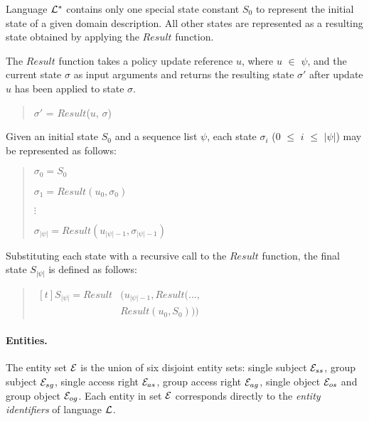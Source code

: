 \documentclass[10pt, twocolumn]{article}
\begin{document}
        Language ${\cal L}^{*}$ contains only one special state constant
        $S_{0}$ to represent the initial state of a given domain description.
        All other states are represented as a resulting state obtained by
        applying the $Result$ function.

        The $Result$ function takes a policy update reference $u$, where $u$
        $\in$ $\psi$, and the current state $\sigma$ as input arguments and
        returns the resulting state $\sigma'$ after update $u$ has been applied
        to state $\sigma$.

        \begin{quote}
          $\sigma'$ = $Result$($u$, $\sigma$)
        \end{quote}

        Given an initial state $S_{0}$ and a sequence list $\psi$, each state
        $\sigma_{i}$ ($0$ $\leq$ $i$ $\leq$ $|\psi|$) may be represented as
        follows:

        \begin{quote}
          $\sigma_{0} = S_{0}$

          $\sigma_{1} = Result(u_{0}, \sigma_{0})$
         
          $\vdots$

          $\sigma_{|\psi|} = Result(u_{|\psi| - 1}, \sigma_{|\psi| - 1})$
        \end{quote}

        Substituting each state with a recursive call to the $Result$ function,
        the final state $S_{|\psi|}$ is defined as follows:

        \begin{quote}
          \begin{math}
            \begin{aligned}[t]
              S_{|\psi|} = Result&(u_{|\psi| - 1}, Result(\ldots, \\
              &Result(u_{0}, S_{0})))
            \end{aligned}
          \end{math}
        \end{quote}

        \paragraph{Entities.}

          The entity set ${\cal E}$ is the union of six disjoint entity sets:
          single subject ${\cal E}_{ss}$, group subject ${\cal E}_{sg}$,
          single access right ${\cal E}_{as}$, group access right
          ${\cal E}_{ag}$, single object ${\cal E}_{os}$ and group object
          ${\cal E}_{og}$. Each entity in set ${\cal E}$ corresponds directly
          to the \emph{entity identifiers} of language ${\cal L}$.
\end{document}
